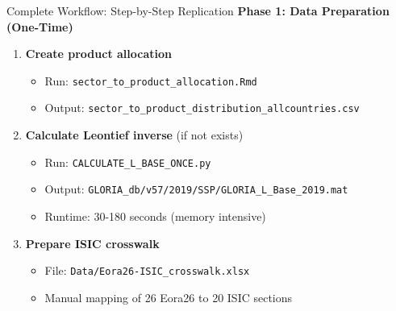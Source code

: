\documentclass[10pt]{beamer}
\begin{document}
\begin{frame}{Complete Workflow: Step-by-Step Replication}
\textbf{Phase 1: Data Preparation (One-Time)}

\vspace{0.2cm}

\begin{enumerate}
    \item \textbf{Create product allocation}
    \begin{itemize}
        \item Run: \texttt{sector\_to\_product\_allocation.Rmd}
        \item Output: \texttt{sector\_to\_product\_distribution\_allcountries.csv}
    \end{itemize}

    \vspace{0.1cm}

    \item \textbf{Calculate Leontief inverse} (if not exists)
    \begin{itemize}
        \item Run: \texttt{CALCULATE\_L\_BASE\_ONCE.py}
        \item Output: \texttt{GLORIA\_db/v57/2019/SSP/GLORIA\_L\_Base\_2019.mat}
        \item Runtime: 30-180 seconds (memory intensive)
    \end{itemize}

    \vspace{0.1cm}

    \item \textbf{Prepare ISIC crosswalk}
    \begin{itemize}
        \item File: \texttt{Data/Eora26-ISIC\_crosswalk.xlsx}
        \item Manual mapping of 26 Eora26 to 20 ISIC sections
    \end{itemize}
\end{enumerate}

\end{frame}
\end{document}
